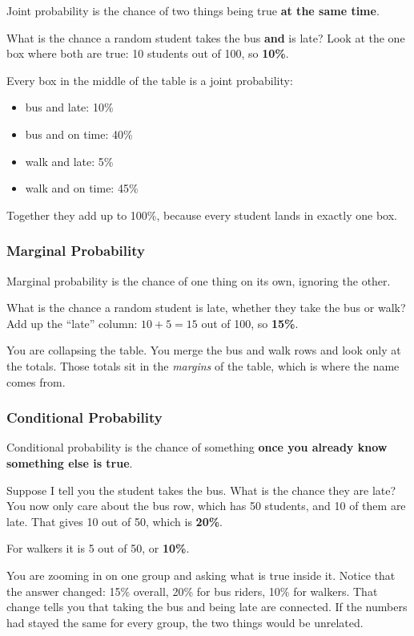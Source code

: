 Joint probability is the chance of two things being true \textbf{at the same time}.

What is the chance a random student takes the bus \textbf{and} is late? Look at the one box where both are true: 10 students out of 100, so \textbf{10\%}.

Every box in the middle of the table is a joint probability:

\begin{itemize}
  \item bus and late: 10\%
  \item bus and on time: 40\%
  \item walk and late: 5\%
  \item walk and on time: 45\%
\end{itemize}

Together they add up to 100\%, because every student lands in exactly one box.

\subsubsection*{Marginal Probability}

Marginal probability is the chance of one thing on its own, ignoring the other.

What is the chance a random student is late, whether they take the bus or walk? Add up the ``late'' column: $10 + 5 = 15$ out of 100, so \textbf{15\%}.

You are collapsing the table. You merge the bus and walk rows and look only at the totals. Those totals sit in the \textit{margins} of the table, which is where the name comes from.

\subsubsection*{Conditional Probability}

Conditional probability is the chance of something \textbf{once you already know something else is true}.

Suppose I tell you the student takes the bus. What is the chance they are late? You now only care about the bus row, which has 50 students, and 10 of them are late. That gives 10 out of 50, which is \textbf{20\%}.

For walkers it is 5 out of 50, or \textbf{10\%}.

You are zooming in on one group and asking what is true inside it. Notice that the answer changed: 15\% overall, 20\% for bus riders, 10\% for walkers. That change tells you that taking the bus and being late are connected. If the numbers had stayed the same for every group, the two things would be unrelated.

